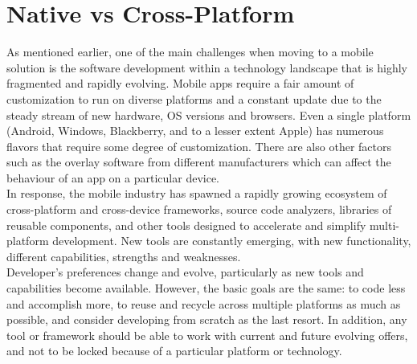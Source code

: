 \section{Native vs Cross-Platform}
As mentioned earlier, one of the main challenges when moving to a mobile solution is the software development within a technology landscape that is highly fragmented and rapidly evolving. Mobile apps require a fair amount of customization to run on diverse platforms and a constant update due to the steady stream of new hardware, OS versions and browsers. Even a single platform (Android, Windows, Blackberry, and to a lesser extent Apple) has numerous flavors that require some degree of customization. There are also other factors such as the overlay software from different manufacturers which can affect the behaviour of an app on a particular device.\\
In response, the mobile industry has spawned a rapidly growing ecosystem of cross-platform and cross-device frameworks, source code analyzers, libraries of reusable components, and other tools designed to accelerate and simplify multi-platform development. New tools are constantly emerging, with new functionality, different capabilities,  strengths and weaknesses.\\
Developer’s preferences change and evolve, particularly as new tools and capabilities become available. However, the basic goals are the same: to code less and accomplish more, to reuse and recycle across multiple platforms as much as possible, and consider developing from scratch as the last resort. In addition, any tool or framework should be able to work with current and future evolving offers, and not to be locked because of a particular platform or technology.\cite{ref7}

